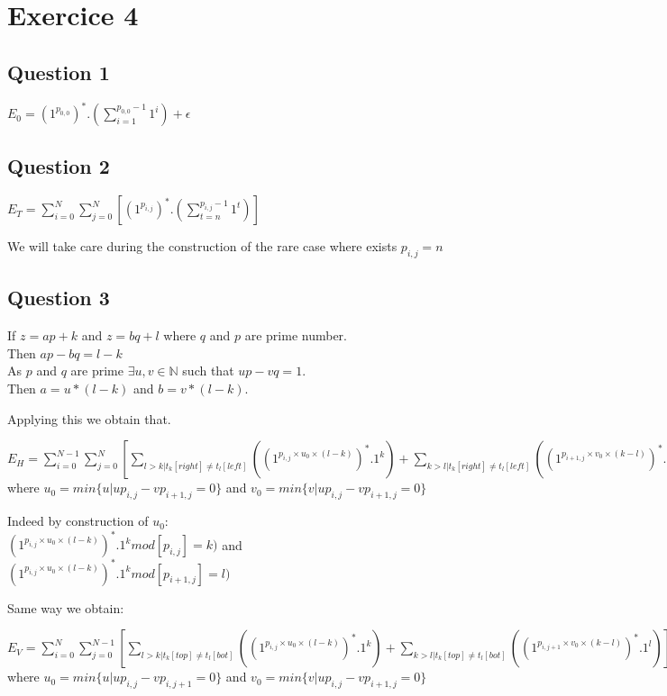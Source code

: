 \section{Exercice 4}
\subsection{Question 1}

$E_0 = (1^{p_{0,0}})^* . (\sum\limits_{i=1}^{p_{0,0}-1}1^i ) + \epsilon$

\subsection{Question 2}

$E_T  = \sum\limits_{i=0}^{N} \sum\limits_{j=0 }^{N} \left[
		 (1^{p_{i,j}})^*.(\sum\limits_{t=n}^{p_{i,j}-1}1^t) \right]$
		 
We will take care during the construction of the rare case where exists $p_{i,j} = n$
		 
\subsection{Question 3}

If $z = ap+k$ and $z = bq +l$ where $q$ and $p$ are prime number.
\\Then $ap - bq = l -k$
\\As $p$ and $q$ are prime $\exists u,v \in \mathbb{N}$ such that $up - vq = 1$.
\\Then $a = u*(l-k)$ and $b = v*(l-k)$.

Applying this we obtain that.

$E_H = \sum\limits_{i=0}^{N-1} \sum\limits_{j=0}^{N} \left[
		\sum\limits_{l>k|t_k[right] \neq t_l[left]}       
		\left(
		(1^{p_{i,j}\times u_0\times (l-k)})^* . 1^k 
		\right)
		+
		\sum\limits_{k>l|t_k[right] \neq t_l[left]}       
		\left(
		(1^{p_{i+1,j}\times v_0\times (k-l)})^* . 1^l 
		\right)
		\right]$ 
\\where $u_0 = min \{u | up_{i,j}-vp_{i+1,j} = 0\}$ and $v_0 = min \{v | up_{i,j}-vp_{i+1,j} = 0\}$

Indeed by construction of $u_0$:
\\$(1^{p_{i,j}\times u_0\times (l-k)})^* . 1^k mod[p_{i,j}] = k)$ and
\\$(1^{p_{i,j}\times u_0\times (l-k)})^* . 1^k mod[p_{i+1,j}] = l)$

Same way we obtain:

$E_V = \sum\limits_{i=0}^{N} \sum\limits_{j=0}^{N-1} \left[
\sum\limits_{l>k|t_k[top] \neq t_l[bot]}       
\left(
(1^{p_{i,j}\times u_0\times (l-k)})^* . 1^k 
\right)
+
\sum\limits_{k>l|t_k[top] \neq t_l[bot]}       
\left(
(1^{p_{i,j+1}\times v_0\times (k-l)})^* . 1^l 
\right)
\right]$ 
\\where $u_0 = min \{u | up_{i,j}-vp_{i,j+1} = 0\}$ and $v_0 = min \{v | up_{i,j}-vp_{i+1,j} = 0\}$

